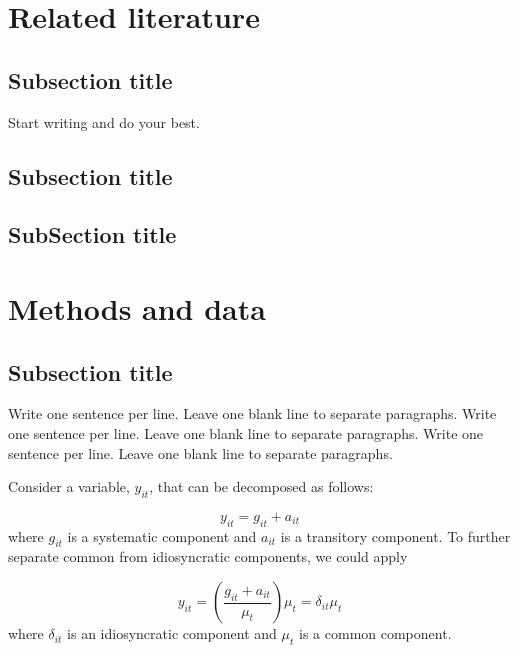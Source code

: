 \documentclass[a4paper, nobind]{templates/ociamthesis}
\begin{document}
\hypertarget{related-literature}{%
\chapter{Related literature}\label{related-literature}}

\hypertarget{subsection-title-1}{%
\section{Subsection title}\label{subsection-title-1}}

Start writing and do your best.

\hypertarget{subsection-title-2}{%
\section{Subsection title}\label{subsection-title-2}}

\hypertarget{subsection-title-3}{%
\section{SubSection title}\label{subsection-title-3}}

\hypertarget{methods-and-data}{%
\chapter{Methods and data}\label{methods-and-data}}

\hypertarget{subsection-title-4}{%
\section{Subsection title}\label{subsection-title-4}}

Write one sentence per line.
Leave one blank line to separate paragraphs.
Write one sentence per line.
Leave one blank line to separate paragraphs.
Write one sentence per line.
Leave one blank line to separate paragraphs.

Consider a variable, \(y_{it}\), that can be decomposed as follows:

\begin{equation}
y_{it}=g_{it}+a_{it}
\end{equation}
where \(g_{it}\) is a systematic component and \(a_{it}\) is a transitory component.
To further separate common from idiosyncratic components, we could apply

\[y_{it}=\left(\frac{g_{it}+a_{it}}{\mu_{t}}\right)\mu_{t}=\delta_{it}\mu_{t}\]
where \(\delta_{it}\) is an idiosyncratic component and \(\mu_{t}\) is a common component.
\end{document}

